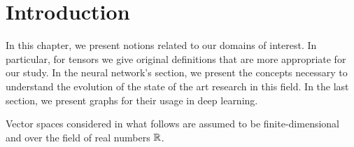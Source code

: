 \section*{Introduction}

In this chapter, we present notions related to our domains of interest. In particular, for tensors we give original definitions that are more appropriate for our study. In the neural network's section, we present the concepts necessary to understand the evolution of the state of the art research in this field. In the last section, we present graphs for their usage in deep learning.

Vector spaces considered in what follows are assumed to be finite-dimensional and over the field of real numbers $\mathbb{R}$.